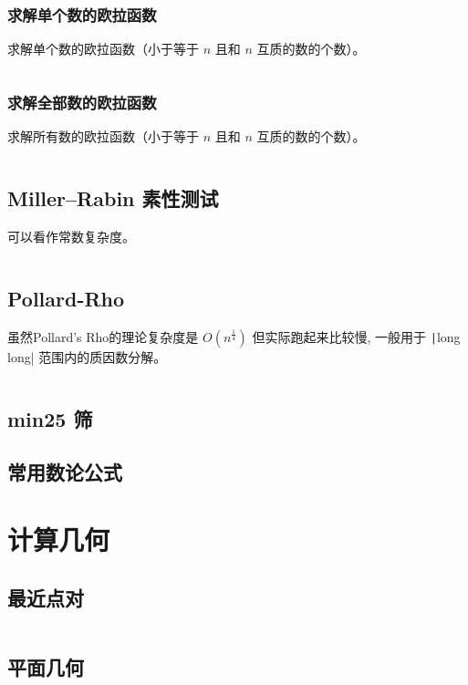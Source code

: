 \documentclass[a4paper, twoside]{article}
\begin{document}
    \subsubsection{求解单个数的欧拉函数}
    求解单个数的欧拉函数（小于等于 $n$ 且和 $n$ 互质的数的个数）。
    \inputminted{cpp}{../src/数论/欧拉函数（求解单个数的欧拉函数）.cpp}

    \subsubsection{求解全部数的欧拉函数}
    求解所有数的欧拉函数（小于等于 $n$ 且和 $n$ 互质的数的个数）。
    \inputminted{cpp}{../src/数论/欧拉函数（求解全部数的欧拉函数）.cpp}

\subsection{Miller–Rabin 素性测试}
可以看作常数复杂度。
\inputminted{cpp}{../src/数论/Miller–Rabin素性测试.cpp}

\subsection{Pollard-Rho}
虽然Pollard's Rho的理论复杂度是 $O(n ^ {\frac{1}{4}})$ 但实际跑起来比较慢, 一般用于 \texttt|long long| 范围内的质因数分解。
\inputminted{cpp}{../src/数论/Pollard-Rho.cpp}

\subsection{min25 筛}

\subsection{常用数论公式}

\newpage
\section{计算几何}
\subsection{最近点对}
\inputminted{cpp}{../src/计算几何/最近点对.cpp}

\subsection{平面几何}
\end{document}
